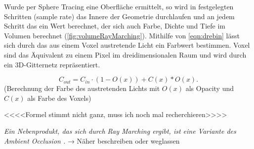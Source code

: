 Wurde per Sphere Tracing eine Oberfläche ermittelt, so wird in festgelegten Schritten (sample rate) das Innere der Geometrie durchlaufen und an jedem Schritt das
ein Wert berechnet, der sich auch Farbe, Dichte und Tiefe im Volumen berechnet (\autoref{fig:volumeRayMarching}).
Mithilfe von \autoref{eqn:drebin} \parencite{Drebin1988} lässt sich durch das aus einem Voxel austretende Licht ein Farbwert bestimmen. 
Voxel sind das Äquivalent zu einem Pixel im dreidimensionalen Raum und wird durch ein 3D-Gitternetz repräsentiert. 

\begin{equation}
	\label{eqn:drebin}
	C_{out} = C_{in} \cdot (1 - O(x)) + C(x) * O(x).
\end{equation}
(Berechnung der Farbe des austretenden Lichts mit $O(x)$ als Opacity und $C(x)$ als Farbe des Voxels)


<<<<Formel stimmt nicht ganz, muss ich noch mal recherchieren>>>>

\textit{
Ein Nebenprodukt, das sich durch Ray Marching ergibt, ist eine Variante des Ambient Occlusion \parencite{Evans2006}.
}
→ Näher beschreiben oder weglassen
